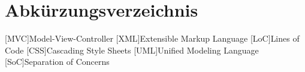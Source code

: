 \chapter*{Abkürzungsverzeichnis}
\label{abkürzungsverzeichnis}

\begin{acronym}
	[MVC]{Model-View-Controller}
	[XML]{Extensible Markup Language}
	[LoC]{Lines of Code}
	[CSS]{Cascading Style Sheets}
	[UML]{Unified Modeling Language}
	[SoC]{Separation of Concerns}
\end{acronym}

